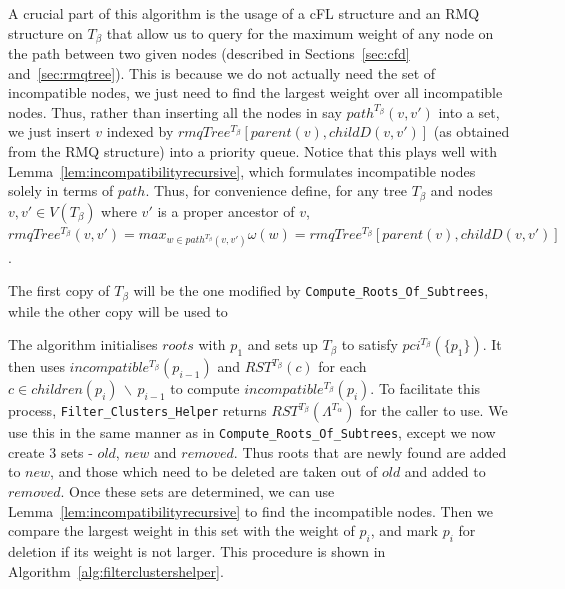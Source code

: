 \documentclass{article}
\newcommand{\leafset}{\Lambda}
\newcommand{\weight}{\omega}
\newcommand{\TA}{T_\alpha}
\newcommand{\TB}{T_\beta}
\begin{document}
    A crucial part of this algorithm is the usage of a cFL structure and an RMQ structure on $\TB$ that allow us to query for the maximum weight of any node on the path between two given nodes (described in Sections~\ref{sec:cfd} and~\ref{sec:rmqtree}). This is because we do not actually need the set of incompatible nodes, we just need to find the largest weight over all incompatible nodes. Thus, rather than inserting all the nodes in say $path^{\TB}(v, v')$ into a set, we just insert $v$ indexed by $rmqTree^{\TB}[parent(v), childD(v, v')]$ (as obtained from the RMQ structure) into a priority queue. Notice that this plays well with Lemma~\ref{lem:incompatibilityrecursive}, which formulates incompatible nodes solely in terms of $path$. Thus, for convenience define, for any tree $\TB$ and nodes $v, v' \in V(\TB)$ where $v'$ is a proper ancestor of $v$, $rmqTree^{\TB}(v, v') = max_{w \in path^{\TB}(v, v')} \weight(w) = rmqTree^{\TB}[parent(v), childD(v, v')]$.

    The first copy of $\TB$ will be the one modified by \texttt{Compute\_Roots\_Of\_Subtrees}, while the other copy will be used to 

    The algorithm initialises $roots$ with $p_1$ and sets up $\TB$ to satisfy $pci^{\TB}(\{p_1\})$. It then uses $incompatible^{\TB}(p_{i-1})$ and $RST^{\TB}(c)$ for each $c \in children(p_i)\, \backslash\, p_{i-1}$ to compute $incompatible^{\TB}(p_i)$. To facilitate this process, \texttt{Filter\_Clusters\_Helper} returns $RST^{\TB}(\leafset^{\TA})$ for the caller to use. We use this in the same manner as in \texttt{Compute\_Roots\_Of\_Subtrees}, except we now create 3 sets - $old$, $new$ and $removed$. Thus roots that are newly found are added to $new$, and those which need to be deleted are taken out of $old$ and added to $removed$. Once these sets are determined, we can use Lemma~\ref{lem:incompatibilityrecursive} to find the incompatible nodes. Then we compare the largest weight in this set with the weight of $p_i$, and mark $p_i$ for deletion if its weight is not larger. This procedure is shown in Algorithm~\ref{alg:filterclustershelper}.
\end{document}
